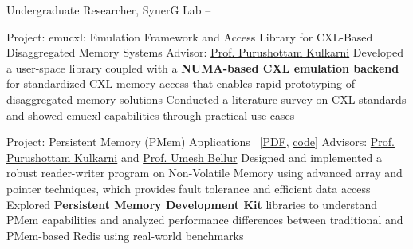 \Gap
\BulletItem
Undergraduate Researcher, SynerG Lab
\hfill
{} --
\begin{Detail}
\SubBulletItem
Project:
emucxl: Emulation Framework and Access Library for CXL-Based Disaggregated Memory Systems
\SubBulletItem
Advisor: \href{https://www.cse.iitb.ac.in/~puru}{Prof. Purushottam Kulkarni}
\SubSubBulletItem
Developed a user-space library coupled with a {\bf NUMA-based CXL emulation backend} for standardized CXL memory access that enables rapid prototyping of disaggregated memory solutions
\SubSubBulletItem 
Conducted a literature survey on CXL standards and showed emucxl capabilities through practical use cases
\end{Detail}

\Gap
\begin{Detail}
\SubBulletItem
Project:
Persistent Memory (PMem) Applications~ [\href{https://rajagond.github.io/docs/rnd1_report.pdf}{PDF}, \href{https://github.com/rajagond/pmem_cxl/tree/main/persistent_memory_rnd1}{code}]
\SubBulletItem
Advisors: \href{https://www.cse.iitb.ac.in/~puru}{Prof. Purushottam Kulkarni} and \href{https://www.cse.iitb.ac.in/~umesh/index.html}{Prof. Umesh Bellur}
\SubSubBulletItem
Designed and implemented a robust reader-writer program on Non-Volatile Memory using advanced array and pointer techniques, which provides fault tolerance and efficient data access
\SubSubBulletItem
Explored {\bf Persistent Memory Development Kit} libraries to understand PMem capabilities and analyzed performance differences between traditional and PMem-based Redis using real-world benchmarks
\end{Detail}